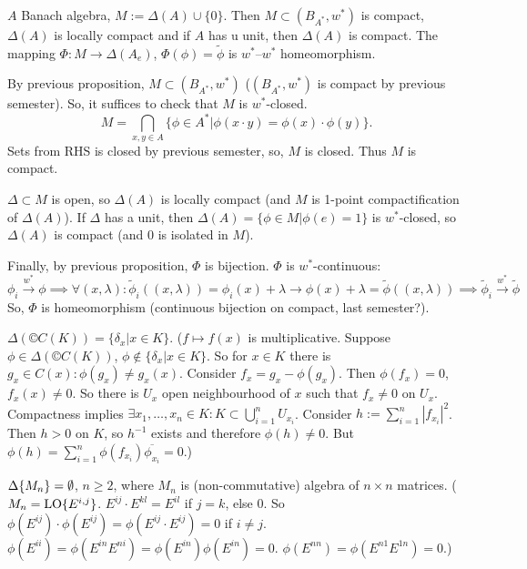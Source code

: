 \documentclass[12pt]{article}					%
\begin{document}
\begin{veta}
	$A$ Banach algebra, $M := \Delta(A) \cup \{0\}$. Then $M \subset (B_{A^*}, w^*)$ is compact, $\Delta(A)$ is locally compact and if $A$ has u unit, then $\Delta(A)$ is compact. The mapping $\Phi: M \rightarrow \Delta(A_e)$, $\Phi(\phi) = \tilde \phi$ is $w^*$–$w^*$ homeomorphism.

	\begin{dukazin}
		By previous proposition, $M \subset (B_{A^*}, w^*)$ ($(B_{A^*}, w^*)$ is compact by previous semester). So, it suffices to check that $M$ is $w^*$-closed.
		$$ M = \bigcap_{x, y \in A} \{\phi \in A^* | \phi(x·y) = \phi(x)·\phi(y)\}. $$
		Sets from RHS is closed by previous semester, so, $M$ is closed. Thus $M$ is compact.

		$\Delta \subset M$ is open, so $\Delta(A)$ is locally compact (and $M$ is 1-point compactification of $\Delta(A)$). If $\Delta$ has a unit, then $\Delta(A) = \{\phi \in M | \phi(e) = 1\}$ is $w^*$-closed, so $\Delta(A)$ is compact (and $0$ is isolated in $M$).

		Finally, by previous proposition, $\Phi$ is bijection. $\Phi$ is $w^*$-continuous:
		$$ \phi_i \overset{w^*}\rightarrow \phi \implies \forall (x, \lambda): \tilde\phi_i((x, \lambda)) = \phi_i(x) + \lambda \rightarrow \phi(x) + \lambda = \tilde \phi((x, \lambda)) \implies \tilde\phi_i \overset{w^*}\rightarrow \tilde\phi $$
		So, $\Phi$ is homeomorphism (continuous bijection on compact, last semester?).
	\end{dukazin}
\end{veta}

\begin{priklady}
	$\Delta(©C(K)) = \{\delta_x | x \in K\}$. ($f \mapsto f(x)$ is multiplicative. Suppose $\phi \in \Delta(©C(K))$, $\phi \notin \{\delta_x | x \in K\}$. So for $x \in K$ there is $g_x \in C(x): \phi(g_x) ≠ g_x(x)$. Consider $f_x = g_x - \phi(g_x)$. Then $\phi(f_x) = 0$, $f_x(x) ≠ 0$. So there is $U_x$ open neighbourhood of $x$ such that $f_x ≠ 0$ on $U_x$. Compactness implies $\exists x_1, …, x_n \in K: K \subset \bigcup_{i=1}^n U_{x_i}$. Consider $h := \sum_{i=1}^n |f_{x_i}|^2$. Then $h > 0$ on $K$, so $h^{-1}$ exists and therefore $\phi(h) ≠ 0$. But $\phi(h) = \sum_{i=1}^n \phi(f_{x_i}) \overline{\phi_{x_i}} = 0$.)

	$\Delta \{M_n\} = \emptyset$, $n ≥ 2$, where $M_n$ is (non-commutative) algebra of $n\times n$ matrices. ($M_n = \operatorname{LO} \{E^{i, j}\}$. $E^{ij}·E^{kl} = E^{il}$ if $j = k$, else $0$. So $\phi(E^{ij})·\phi(E^{ij}) = \phi(E^{ij}·E^{ij}) = 0$ if $i ≠ j$. $\phi(E^{ii}) = \phi(E^{in}E^{ni}) = \phi(E^{in})\phi(E^{in}) = 0$. $\phi(E^{nn}) = \phi(E^{n1}E^{1n}) = 0$.)
\end{priklady}
\end{document}
